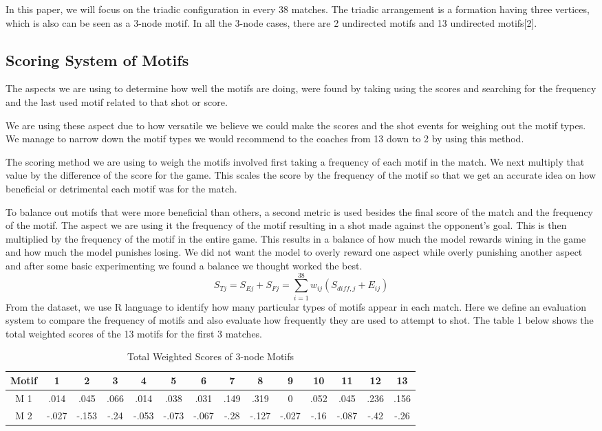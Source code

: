 \documentclass{mcmthesis}
\begin{document}
In this paper, we will focus on the triadic configuration in every 38 matches. The triadic arrangement is a formation having three vertices, which is also can be seen as a 3-node motif. In all the 3-node cases, there are 2 undirected motifs and 13 undirected motifs[2]. 

\subsection {Scoring System of Motifs}
The aspects we are using to determine how well the motifs are doing, were found by taking using the scores and searching for the frequency and the last used motif related to that shot or score. 

We are using these aspect due to how versatile we believe we could make the scores and the shot events for weighing out the motif types. We manage to narrow down the motif types we would recommend to the coaches from 13 down to 2 by using this method. 

The scoring method we are using to weigh the motifs involved first taking a frequency of each motif in the match. We next multiply that value by the difference of the score for the game. This scales the score by the frequency of the motif so that we get an accurate idea on how beneficial or detrimental each motif was for the match. 

To balance out motifs that were more beneficial than others, a second metric is used besides the final score of the match and the frequency of the motif. The aspect we are using it the frequency of the motif resulting in a shot made against the opponent’s goal. This is then multiplied by the frequency of the motif in the entire game. This results in a balance of how much the model rewards wining in the game and how much the model punishes losing. We did not want the model to overly reward one aspect while overly punishing another aspect and after some basic experimenting we found a balance we thought worked the best. 
\begin{equation}
S_{Tj}= S_{Ej}+S_{Fj}=\sum_{i=1}^{38}{w_{ij}(S_{diff,j}+E_{ij})}
\end{equation}
From the dataset, we use R language to identify how many particular types of motifs appear in each match. Here we define an evaluation system to compare the frequency of motifs and also evaluate how frequently they are used to attempt to shot. The table 1 below shows the total weighted scores of the 13 motifs for the first 3 matches.

\begin{table}[thb]
\caption{Total Weighted Scores of 3-node Motifs}
\centering
\begin{tabular}{ c c c c c c c c c c c c c c}
\hline
Motif & 1&2&3&4&5&6&7&8&9&10&11&12&13\\
\hline
M 1 &.014& .045&.066&.014&.038&.031&.149&.319&0&.052&.045&.236&.156\\
M 2&-.027&-.153&-.24&-.053&-.073&-.067&-.28&-.127&-.027&-.16&-.087&-.42&-.26\\
\hline
\end{tabular}
\end{table}
\end{document}
